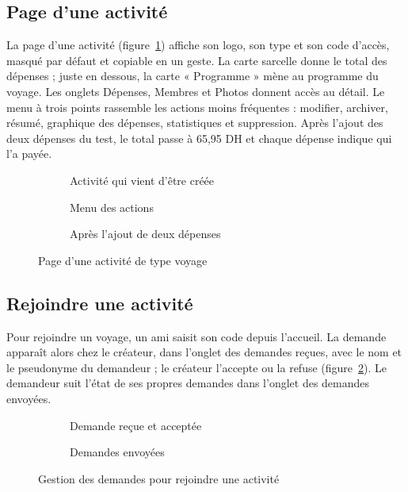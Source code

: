 \subsection{Page d'une activité}

La page d'une activité (figure~\ref{fig:ecran_activite}) affiche son logo, son type et son
code d'accès, masqué par défaut et copiable en un geste. La carte sarcelle donne le total des
dépenses ; juste en dessous, la carte « Programme » mène au programme du voyage. Les onglets
Dépenses, Membres et Photos donnent accès au détail. Le menu à trois points rassemble les
actions moins fréquentes : modifier, archiver, résumé, graphique des dépenses, statistiques
et suppression. Après l'ajout des deux dépenses du test, le total passe à 65,95 DH et chaque
dépense indique qui l'a payée.

\begin{figure}[H]
\centering
\begin{subfigure}[t]{0.31\textwidth}\centering{}\caption{Activité qui vient d'être créée}\end{subfigure}\hfill
\begin{subfigure}[t]{0.31\textwidth}\centering{}\caption{Menu des actions}\end{subfigure}\hfill
\begin{subfigure}[t]{0.31\textwidth}\centering{}\caption{Après l'ajout de deux dépenses}\end{subfigure}
\caption{Page d'une activité de type voyage}
\label{fig:ecran_activite}
\end{figure}

\subsection{Rejoindre une activité}

Pour rejoindre un voyage, un ami saisit son code depuis l'accueil. La demande apparaît alors
chez le créateur, dans l'onglet des demandes reçues, avec le nom et le pseudonyme du
demandeur ; le créateur l'accepte ou la refuse (figure~\ref{fig:ecran_demandes}). Le
demandeur suit l'état de ses propres demandes dans l'onglet des demandes envoyées.

\begin{figure}[H]
\centering
\begin{subfigure}[t]{0.31\textwidth}\centering{}\caption{Demande reçue et acceptée}\end{subfigure}\hspace{0.05\textwidth}
\begin{subfigure}[t]{0.31\textwidth}\centering{}\caption{Demandes envoyées}\end{subfigure}
\caption{Gestion des demandes pour rejoindre une activité}
\label{fig:ecran_demandes}
\end{figure}

